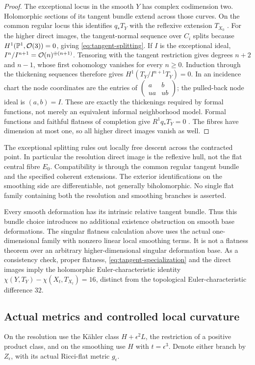 \begin{proof}
The exceptional locus in the smooth $Y$ has complex codimension two. Holomorphic sections of its tangent bundle extend
across those curves. On the common regular locus this identifies
$q_*T_Y$ with the reflexive extension $T_{X_0}$
\cite[Tags 0EBJ and 0AY6]{stacks}.
For the higher direct images, the tangent-normal sequence over $C_i$
splits because $H^1(\mathbb P^1,\mathcal O(3))=0$, giving
\eqref{eq:tangent-splitting}. If $I$ is the exceptional ideal,
$I^n/I^{n+1}=\mathcal O(n)^{\oplus(n+1)}$. Tensoring with the tangent
restriction gives degrees $n+2$ and $n-1$, whose first cohomology
vanishes for every $n\ge0$. Induction through the thickening sequences
therefore gives $H^1(T_Y/I^{n+1}T_Y)=0$.
In an incidence chart the node coordinates are the entries of
$\left(\begin{smallmatrix}a&b\\ua&ub\end{smallmatrix}\right)$;
the pulled-back node ideal is $(a,b)=I$. These are exactly the
thickenings required by formal functions, not merely an equivalent
informal neighborhood model. Formal functions and faithful flatness
of completion give $R^1q_*T_Y=0$ \cite[Tag 02OC]{stacks}.
The fibres have dimension at most one, so all higher direct images
vanish as well.
\end{proof}

The exceptional splitting rules out locally free descent across the
contracted point. In particular the resolution direct image is the
reflexive hull, not the flat central fibre $E_0$. Compatibility is
through the common regular tangent bundle and the specified coherent
extensions. The exterior identifications on the smoothing side are
differentiable, not generally biholomorphic. No single flat family
containing both the resolution and smoothing branches is asserted.

Every smooth deformation has its intrinsic relative tangent bundle.
Thus this bundle choice introduces no additional existence obstruction
on smooth base deformations. The singular flatness calculation above
uses the actual one-dimensional family with nonzero linear local
smoothing terms. It is not a flatness theorem over an arbitrary
higher-dimensional singular deformation base. As a consistency check,
proper flatness, \eqref{eq:tangent-specialization} and the direct images
imply the holomorphic Euler-characteristic identity
$\chi(Y,T_Y)-\chi(X_t,T_{X_t})=16$, distinct from the topological
Euler-characteristic difference $32$.

\subsection{Actual metrics and controlled local curvature}
On the resolution use the K\"ahler class $H+\epsilon^2L$, the restriction
of a positive product class, and on the smoothing use $H$ with
$t=\epsilon^3$. Denote either branch by $Z_\epsilon$, with its actual
Ricci-flat metric $g_\epsilon$.

